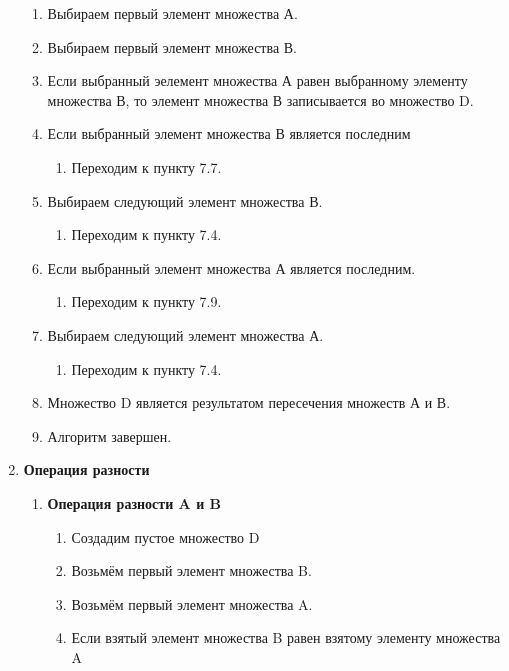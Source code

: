 \documentclass[a4paper,12pt]{extarticle}
\begin{document}
\begin{enumerate}
\begin{enumerate}[label*=\arabic*.]
    \item Выбираем первый элемент множества А.
    \item Выбираем первый элемент множества В.
    \item Если выбранный эелемент множества А равен выбранному элементу множества В, то элемент множества В записывается во множество D.
    \item Если выбранный элемент множества В является последним
    \begin{enumerate}[label*=\arabic*.]
      \item Переходим к пункту 7.7.
    \end{enumerate}
    \item Выбираем следующий элемент множества В.
    \begin{enumerate}[label*=\arabic*.]
      \item Переходим к пункту 7.4.
    \end{enumerate}
    \item Если выбранный элемент множества А является последним.
    \begin{enumerate}[label*=\arabic*.]
      \item Переходим к пункту 7.9.
    \end{enumerate}
    \item Выбираем следующий элемент множества А.
    \begin{enumerate}[label*=\arabic*.]
      \item Переходим к пункту 7.4.
    \end{enumerate}
    \item Множество D является результатом пересечения множеств А и В.
    \item Алгоритм завершен.
  \end{enumerate}
  \item \textbf{Операция разности}
  \begin{enumerate}[label*=\arabic*.]
  \item \textbf{Операция разности A и B}
  \begin{enumerate}[label*=\arabic*.]
    \item Создадим пустое множество D
    \item Возьмём первый элемент множества B.
    \item Возьмём первый элемент множества A.
    \item Если взятый элемент множества B равен взятому элементу множества A
    \begin{enumerate}[label*=\arabic*.]

\end{enumerate}
\end{enumerate}
\end{enumerate}
\end{enumerate}
\end{document}
